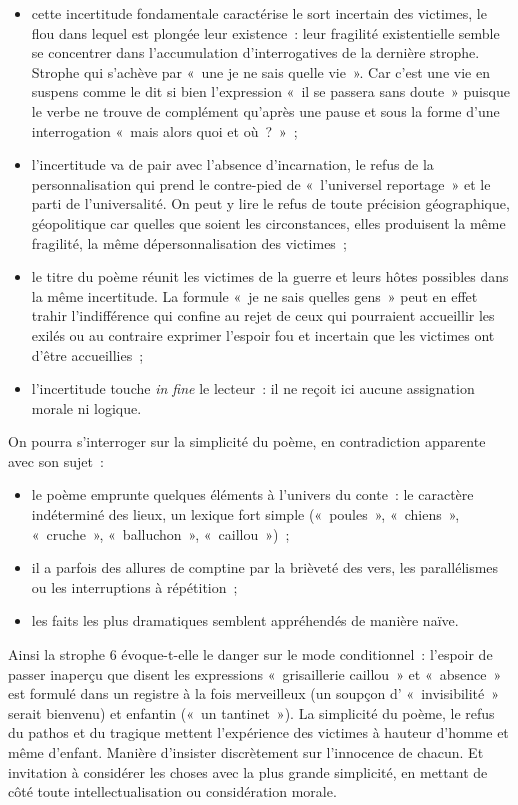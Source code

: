 {\begin{itemize}
\item cette incertitude fondamentale caractérise le sort incertain des victimes, le flou
dans lequel est plongée leur existence~: leur fragilité existentielle semble se concentrer
dans l'accumulation d'interrogatives de la dernière strophe. Strophe qui s'achève par
«~une je ne sais quelle vie~». Car c'est une vie en suspens comme le dit si bien
l'expression «~il se passera sans doute~» puisque le verbe ne trouve de complément
qu'après une pause et sous la forme d'une interrogation «~mais alors quoi et où~?~»~;

\item l'incertitude va de pair avec l'absence d'incarnation, le refus de la
personnalisation qui prend le contre-pied de «~l'universel reportage~» et le parti de
l'universalité. On peut y lire le refus de toute précision géographique, géopolitique car
quelles que soient les circonstances, elles produisent la même fragilité, la même
dépersonnalisation des victimes~;

\item le titre du poème réunit les victimes de la guerre et leurs hôtes possibles dans
la même incertitude. La formule «~je ne sais quelles gens~» peut en effet trahir
l'indifférence qui confine au rejet de ceux qui pourraient accueillir les exilés ou au
contraire exprimer l'espoir fou et incertain que les victimes ont d'être accueillies~;
\item l'incertitude touche \emph{in fine} le lecteur~: il ne reçoit ici aucune assignation morale
ni logique.
\end{itemize}

On pourra s'interroger sur la simplicité du poème, en contradiction apparente
avec son sujet~:

\begin{itemize}
\item le poème emprunte quelques éléments à l'univers du conte~: le caractère
indéterminé des lieux, un lexique fort simple («~poules~»,
«~chiens~», «~cruche~», «~balluchon~», «~caillou~»)~;

\item il a parfois des allures de comptine par la brièveté des vers, les parallélismes
ou les interruptions à répétition~;

\item les faits les plus dramatiques semblent appréhendés de manière naïve.
\end{itemize}

Ainsi la strophe 6 évoque-t-elle le danger sur le mode conditionnel~: l'espoir de passer
inaperçu que disent les expressions «~grisaillerie caillou~» et «~absence~» est formulé
dans un registre à la fois merveilleux (un soupçon d' «~invisibilité~» serait bienvenu) et
enfantin («~un tantinet~»).
La simplicité du poème, le refus du pathos et du tragique mettent l'expérience des
victimes à hauteur d'homme et même d'enfant. Manière d'insister discrètement sur
l'innocence de chacun. Et invitation à considérer les choses avec la plus grande
simplicité, en mettant de côté toute intellectualisation ou considération morale.}%
